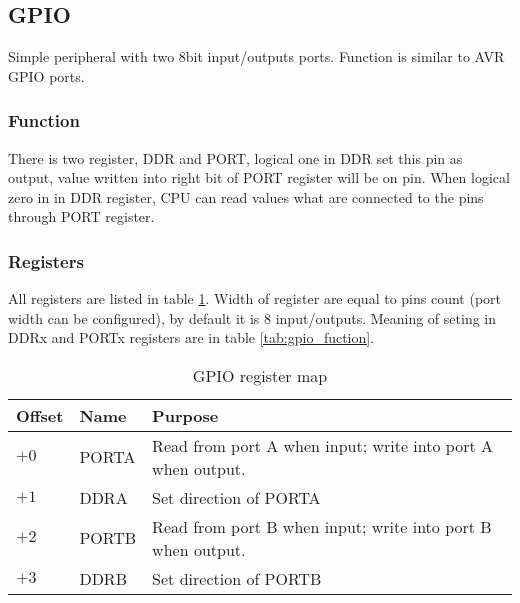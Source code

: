 \subsection{GPIO}

Simple peripheral with two 8bit input/outputs ports. Function is similar to AVR
GPIO ports.

\subsubsection{Function}

There is two register, DDR and PORT, logical one in DDR set this
pin as output, value written into right bit of PORT register will be on pin.
When logical zero in in DDR register, CPU can read values what are connected to
the pins through PORT register.

\subsubsection{Registers}

All registers are listed in table \ref{tab:gpio_reg_map}. Width of register are
equal to pins count (port width can be configured), by default it is 8
input/outputs. Meaning of seting in DDRx and PORTx registers are in table
\ref{tab:gpio_fuction}.

\begin{table}[h]
    \centering
    \begin{tabular}{|l|l|l|}
        \hline
        \textbf{Offset} & \textbf{Name} & \textbf{Purpose}                                            \\ \hline
        $+0$            & PORTA         & Read from port A when input; write into port A when output. \\ \hline
        $+1$            & DDRA          & Set direction of PORTA                                      \\ \hline
        $+2$            & PORTB         & Read from port B when input; write into port B when output. \\ \hline
        $+3$            & DDRB          & Set direction of PORTB                                      \\ \hline
    \end{tabular}
    \caption{GPIO register map}
    \label{tab:gpio_reg_map}
\end{table}

